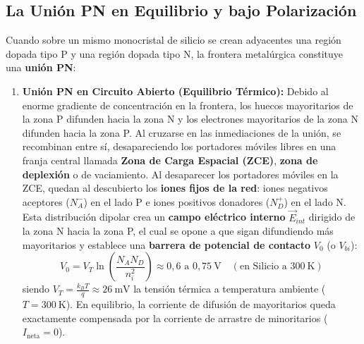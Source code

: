 \subsection{La Unión PN en Equilibrio y bajo Polarización}
Cuando sobre un mismo monocristal de silicio se crean adyacentes una región dopada tipo P y una región dopada tipo N, la frontera metalúrgica constituye una \textbf{unión PN}:
\begin{enumerate}[leftmargin=*]
    \item \textbf{Unión PN en Circuito Abierto (Equilibrio Térmico):}
    Debido al enorme gradiente de concentración en la frontera, los huecos mayoritarios de la zona P difunden hacia la zona N y los electrones mayoritarios de la zona N difunden hacia la zona P. Al cruzarse en las inmediaciones de la unión, se recombinan entre sí, desapareciendo los portadores móviles libres en una franja central llamada \textbf{Zona de Carga Espacial (ZCE)}, \textbf{zona de deplexión} o de vaciamiento.
    Al desaparecer los portadores móviles en la ZCE, quedan al descubierto los \textbf{iones fijos de la red}: iones negativos aceptores ($N_A^-$) en el lado P e iones positivos donadores ($N_D^+$) en el lado N. Esta distribución dipolar crea un \textbf{campo eléctrico interno} $\vec{E}_{int}$ dirigido de la zona N hacia la zona P, el cual se opone a que sigan difundiendo más mayoritarios y establece una \textbf{barrera de potencial de contacto} $V_0$ (o $V_{bi}$):
    \begin{equation}
        V_0 = V_T \ln\left(\frac{N_A N_D}{n_i^2}\right) \approx 0{,}6\text{ a }0{,}75\ \si{\volt} \quad (\text{en Silicio a } 300\ \si{\kelvin})
    \end{equation}
    siendo $V_T = \frac{k_B T}{q} \approx 26\ \si{\milli\volt}$ la tensión térmica a temperatura ambiente ($T = 300\ \si{\kelvin}$). En equilibrio, la corriente de difusión de mayoritarios queda exactamente compensada por la corriente de arrastre de minoritarios ($I_{\text{neta}} = 0$).
\end{enumerate}

